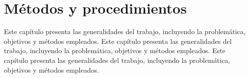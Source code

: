 \section{Métodos y procedimientos}
Este capítulo presenta las generalidades del trabajo, incluyendo la problemática, objetivos y métodos empleados. Este capítulo presenta las generalidades del trabajo, incluyendo la problemática, objetivos y métodos empleados. Este capítulo presenta las generalidades del trabajo, incluyendo la problemática, objetivos y métodos empleados.
